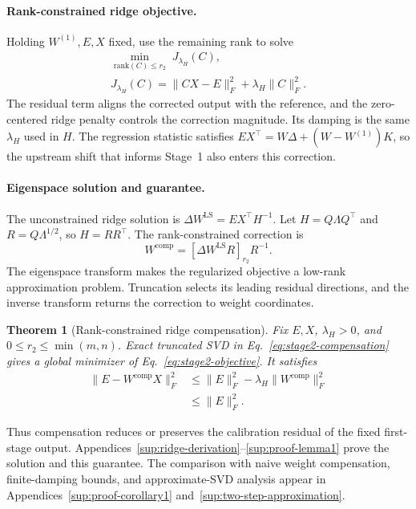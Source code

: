 \documentclass[11pt]{article}
\newtheorem{theorem}{Theorem}
\begin{document}
\paragraph{Rank-constrained ridge objective.}
Holding $W^{(1)},E,X$ fixed, use the remaining rank to solve
\begin{equation}
\begin{aligned}
\min_{\mathrm{rank}(C)\le r_2}\;J_{\lambda_H}(C),\\
J_{\lambda_H}(C)=\|CX-E\|_F^2+\lambda_H\|C\|_F^2.
\end{aligned}
\label{eq:stage2-objective}
\end{equation}
The residual term aligns the corrected output with the reference, and the zero-centered ridge penalty controls the correction magnitude. Its damping is the same $\lambda_H$ used in $H$. The regression statistic satisfies $EX^\top=W\Delta+(W-W^{(1)})K$, so the upstream shift that informs Stage~1 also enters this correction.

\paragraph{Eigenspace solution and guarantee.}
The unconstrained ridge solution is $\Delta W^{\mathrm{LS}}=EX^\top H^{-1}$. Let $H=Q\Lambda Q^\top$ and $R=Q\Lambda^{1/2}$, so $H=RR^\top$. The rank-constrained correction is
\begin{equation}
W^{\mathrm{comp}}=[\Delta W^{\mathrm{LS}}R]_{r_2}R^{-1}.
\label{eq:stage2-compensation}
\end{equation}
The eigenspace transform makes the regularized objective a low-rank approximation problem. Truncation selects its leading residual directions, and the inverse transform returns the correction to weight coordinates.

\begin{theorem}[Rank-constrained ridge compensation]\label{thm:ridge-compensation}
Fix $E,X$, $\lambda_H>0$, and $0\le r_2\le\min(m,n)$. Exact truncated SVD in Eq.~\eqref{eq:stage2-compensation} gives a global minimizer of Eq.~\eqref{eq:stage2-objective}. It satisfies
\begin{equation}
\begin{aligned}
\|E-W^{\mathrm{comp}}X\|_F^2
&\le\|E\|_F^2-\lambda_H\|W^{\mathrm{comp}}\|_F^2\\
&\le\|E\|_F^2.
\end{aligned}
\label{eq:lemma-residual}
\end{equation}
\end{theorem}
Thus compensation reduces or preserves the calibration residual of the fixed first-stage output. Appendices~\ref{sup:ridge-derivation}--\ref{sup:proof-lemma1} prove the solution and this guarantee. The comparison with naive weight compensation, finite-damping bounds, and approximate-SVD analysis appear in Appendices~\ref{sup:proof-corollary1} and~\ref{sup:two-step-approximation}.
\end{document}
